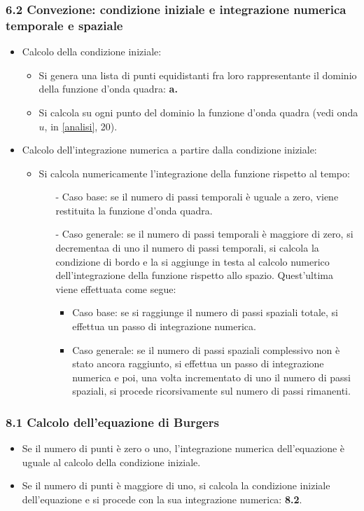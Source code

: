 \subsubsection*{6.2 Convezione: condizione iniziale e integrazione numerica temporale e spaziale}
\begin{itemize}
\item Calcolo della condizione iniziale:
\begin{itemize}
\item Si genera una lista di punti equidistanti fra loro rappresentante il dominio della funzione d'onda quadra: \textbf{a.} 
\item Si calcola su ogni punto del dominio la funzione d'onda quadra (vedi onda $u$, in \ref{analisi}, 20). 
\end{itemize}
\item Calcolo dell'integrazione numerica a partire dalla condizione iniziale:
\begin{itemize}
\item Si calcola numericamente l'integrazione della funzione rispetto al tempo:
\begin{itemize}
\item[-] Caso base: se il numero di passi temporali è uguale a zero, viene restituita la funzione d'onda quadra.
\item[-] Caso generale: se il numero di passi temporali è maggiore di zero, si decrementaa di uno il numero di passi temporali, si calcola la condizione di bordo e la si aggiunge in testa al calcolo numerico dell'integrazione della funzione rispetto allo spazio. Quest'ultima viene effettuata come segue:
\begin{itemize}
\item Caso base: se si raggiunge il numero di passi spaziali totale, si effettua un passo di integrazione numerica.
\item Caso generale: se il numero di passi spaziali complessivo non è stato ancora raggiunto, si effettua un passo di integrazione numerica e poi, una volta incrementato di uno il numero di passi spaziali, si procede ricorsivamente sul numero di passi rimanenti. 
\end{itemize}
\end{itemize}
\end{itemize}
\end{itemize}

\subsubsection*{8.1 Calcolo dell'equazione di Burgers}
\begin{itemize}
\item Se il numero di punti è zero o uno, l'integrazione numerica dell'equazione è uguale al calcolo della condizione iniziale.
\item Se il numero di punti è maggiore di uno, si calcola la condizione iniziale dell'equazione e si procede con la sua integrazione numerica: \textbf{8.2}. 
\end{itemize}


